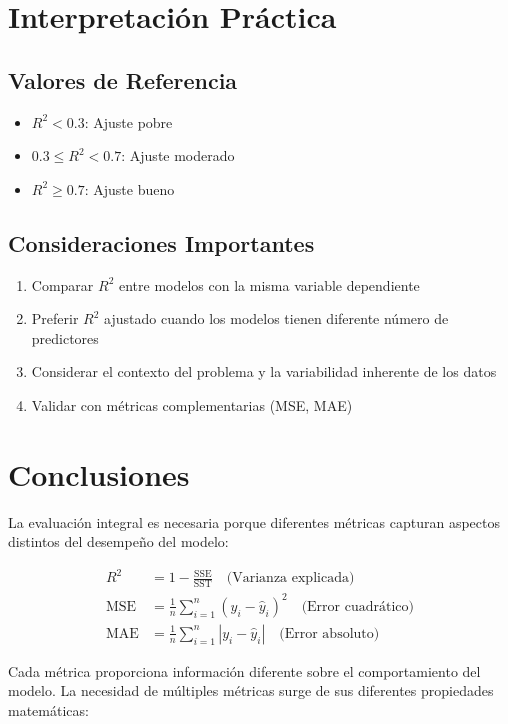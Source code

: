 \documentclass[12pt]{article}
\begin{document}
\section{Interpretación Práctica}

\subsection{Valores de Referencia}

\begin{itemize}
\item $R^2 < 0.3$: Ajuste pobre
\item $0.3 \leq R^2 < 0.7$: Ajuste moderado
\item $R^2 \geq 0.7$: Ajuste bueno
\end{itemize}

\subsection{Consideraciones Importantes}

\begin{enumerate}
\item Comparar $R^2$ entre modelos con la misma variable dependiente
\item Preferir $R^2$ ajustado cuando los modelos tienen diferente número de predictores
\item Considerar el contexto del problema y la variabilidad inherente de los datos
\item Validar con métricas complementarias (MSE, MAE)
\end{enumerate}

\section{Conclusiones}

La evaluación integral es necesaria porque diferentes métricas capturan aspectos distintos del desempeño del modelo:

\begin{align*}
R^2 &= 1 - \frac{\text{SSE}}{\text{SST}} \quad \text{(Varianza explicada)} \\
\text{MSE} &= \frac{1}{n}\sum_{i=1}^n (y_i - \hat{y}_i)^2 \quad \text{(Error cuadrático)} \\
\text{MAE} &= \frac{1}{n}\sum_{i=1}^n |y_i - \hat{y}_i| \quad \text{(Error absoluto)}
\end{align*}

Cada métrica proporciona información diferente sobre el comportamiento del modelo. La necesidad de múltiples métricas surge de sus diferentes propiedades matemáticas:
\end{document}
